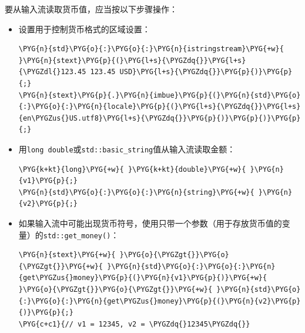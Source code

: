 
要从输入流读取货币值，应当按以下步骤操作：



\begin{itemize}
\item 设置用于控制货币格式的区域设置：



\begin{codeblockbg}
\begin{Verbatim}[commandchars=\\\{\},breaklines=true,breakanywhere=true,fontsize=\codefont,xleftmargin=17bp]
\PYG{n}{std}\PYG{o}{:}\PYG{o}{:}\PYG{n}{istringstream}\PYG{+w}{ }\PYG{n}{stext}\PYG{p}{(}\PYG{l+s}{\PYGZdq{}}\PYG{l+s}{\PYGZdl{}123.45 123.45 USD}\PYG{l+s}{\PYGZdq{}}\PYG{p}{)}\PYG{p}{;}
\PYG{n}{stext}\PYG{p}{.}\PYG{n}{imbue}\PYG{p}{(}\PYG{n}{std}\PYG{o}{:}\PYG{o}{:}\PYG{n}{locale}\PYG{p}{(}\PYG{l+s}{\PYGZdq{}}\PYG{l+s}{en\PYGZus{}US.utf8}\PYG{l+s}{\PYGZdq{}}\PYG{p}{)}\PYG{p}{)}\PYG{p}{;}
\end{Verbatim}
\end{codeblockbg}



\item 用\texttt{long double}或\texttt{std::\allowbreak{}basic\_\allowbreak{}string}值从输入流读取金额：



\begin{codeblockbg}
\begin{Verbatim}[commandchars=\\\{\},breaklines=true,breakanywhere=true,fontsize=\codefont,xleftmargin=17bp]
\PYG{k+kt}{long}\PYG{+w}{ }\PYG{k+kt}{double}\PYG{+w}{ }\PYG{n}{v1}\PYG{p}{;}
\PYG{n}{std}\PYG{o}{:}\PYG{o}{:}\PYG{n}{string}\PYG{+w}{ }\PYG{n}{v2}\PYG{p}{;}
\end{Verbatim}
\end{codeblockbg}



\item 如果输入流中可能出现货币符号，使用只带一个参数（用于存放货币值的变量）的\texttt{std::\allowbreak{}get\_\allowbreak{}money()}：



\begin{codeblockbg}
\begin{Verbatim}[commandchars=\\\{\},breaklines=true,breakanywhere=true,fontsize=\codefont,xleftmargin=17bp]
\PYG{n}{stext}\PYG{+w}{ }\PYG{o}{\PYGZgt{}}\PYG{o}{\PYGZgt{}}\PYG{+w}{ }\PYG{n}{std}\PYG{o}{:}\PYG{o}{:}\PYG{n}{get\PYGZus{}money}\PYG{p}{(}\PYG{n}{v1}\PYG{p}{)}\PYG{+w}{ }\PYG{o}{\PYGZgt{}}\PYG{o}{\PYGZgt{}}\PYG{+w}{ }\PYG{n}{std}\PYG{o}{:}\PYG{o}{:}\PYG{n}{get\PYGZus{}money}\PYG{p}{(}\PYG{n}{v2}\PYG{p}{)}\PYG{p}{;}
\PYG{c+c1}{// v1 = 12345, v2 = \PYGZdq{}12345\PYGZdq{}}
\end{Verbatim}
\end{codeblockbg}



\end{itemize}
